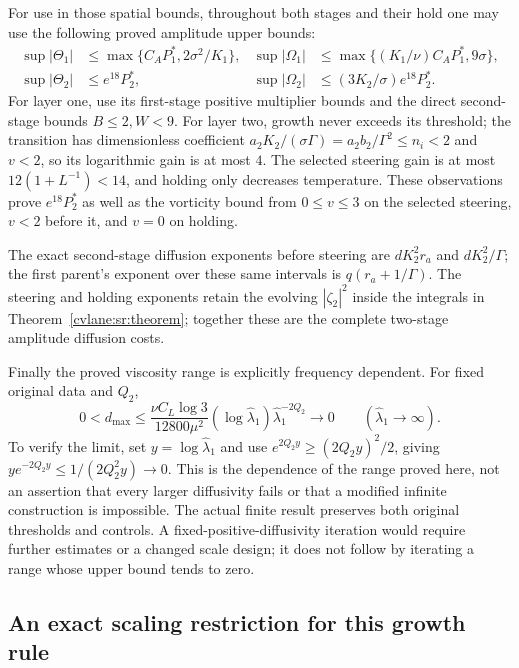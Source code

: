 For use in those spatial bounds, throughout both stages and their hold
one may use the following proved amplitude upper bounds:
\begin{align}
 \sup|\Theta_1|&\leq
       \max\{C_AP_1^*,2\sigma^2/K_1\},&
 \sup|\Omega_1|&\leq
       \max\{(K_1/\nu)C_AP_1^*,9\sigma\},\nonumber\\
 \sup|\Theta_2|&\leq e^{18}P_2^*,&
 \sup|\Omega_2|&\leq (3K_2/\sigma)e^{18}P_2^*.
 \label{cvlane:ave:amplitude_sup}
\end{align}
For layer one, use its first-stage positive multiplier bounds and
the direct second-stage bounds $B\leq2,W<9$.
For layer two, growth never exceeds its threshold; the transition
has dimensionless coefficient $a_2K_2/(\sigma\Gamma)
=a_2b_2/\Gamma^2\leq n_i<2$ and $v<2$, so its logarithmic
gain is at most $4$. The selected steering gain is at most
$12(1+L^{-1})<14$, and holding only decreases temperature.
These observations prove $e^{18}P_2^*$ as well as the vorticity
bound from $0\leq v\leq3$ on the selected steering, $v<2$ before it,
and $v=0$ on holding.

The exact second-stage diffusion exponents before steering are
$dK_2^2r_a$ and $dK_2^2/\Gamma$; the first parent's exponent
over these same intervals is $q(r_a+1/\Gamma)$.
The steering and holding exponents retain the evolving $|\zeta_2|^2$
inside the integrals in Theorem~\ref{cvlane:sr:theorem}; together these are
the complete two-stage amplitude diffusion costs.

Finally the proved viscosity range is explicitly frequency dependent.
For fixed original data and $Q_2$,
\begin{equation}\label{cvlane:ave:range_limit}
 0<d_{\max}\leq
 \frac{\nu C_L\log3}{12800\mu^2}
 (\log\widehat\lambda_1)\widehat\lambda_1^{-2Q_2}
 \longrightarrow0\qquad(\widehat\lambda_1\longrightarrow\infty).
\end{equation}
To verify the limit, set $y=\log\widehat\lambda_1$ and use
$e^{2Q_2y}\geq(2Q_2y)^2/2$, giving
$ye^{-2Q_2y}\leq1/(2Q_2^2y)\to0$.
This is the dependence of the range proved here, not an assertion
that every larger diffusivity fails or that a modified infinite
construction is impossible. The actual finite result preserves both
original thresholds and controls. A fixed-positive-diffusivity
iteration would require further estimates or a changed scale design;
it does not follow by iterating a range whose upper bound tends to zero.

\subsection{An exact scaling restriction for this growth rule}

